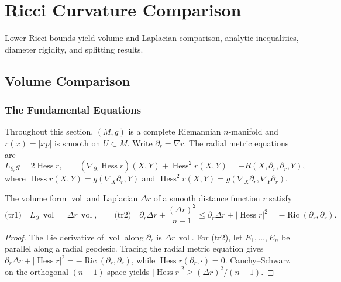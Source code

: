 \chapter{Ricci Curvature Comparison}
\label{chap:pet-ricci-curvature-comparison}

\newcommand{\Ric}{\operatorname{Ric}}
\newcommand{\Hess}{\operatorname{Hess}}
\newcommand{\vol}{\operatorname{vol}}
\newcommand{\diam}{\operatorname{diam}}
\newcommand{\Iso}{\mathrm{Iso}}
\newcommand{\snk}{\mathrm{sn}}

Lower Ricci bounds yield volume and Laplacian comparison, analytic
inequalities, diameter rigidity, and splitting results.

\section{Volume Comparison}

\subsection{The Fundamental Equations}

Throughout this section, $(M,g)$ is a complete Riemannian $n$-manifold and
$r(x)=|xp|$ is smooth on $U\subset M$. Write $\partial_r=\nabla r$. The radial
metric equations are
\[
  L_{\partial_r}g=2\Hess r,
  \qquad
  (\nabla_{\partial_r}\Hess r)(X,Y)+\Hess^2r(X,Y)=-R(X,\partial_r,\partial_r,Y),
\]
where $\Hess r(X,Y)=g(\nabla_X\partial_r,Y)$ and
$\Hess^2r(X,Y)=g(\nabla_X\partial_r,\nabla_Y\partial_r)$.

\begin{proposition}
  \label{prop:pet-ch7-volume-form-laplacian-trace}

  The volume form $\vol$ and Laplacian $\Delta r$ of a smooth distance
  function $r$ satisfy
  \[
    \text{(tr1)}\quad L_{\partial_r}\vol=\Delta r\,\vol,
    \qquad
    \text{(tr2)}\quad \partial_r\Delta r+\frac{(\Delta r)^2}{n-1}
    \le\partial_r\Delta r+|\Hess r|^2=-\Ric(\partial_r,\partial_r).
  \]
\end{proposition}
\begin{proof}
  \sketch
  The Lie derivative of \(\vol\) along \(\partial_r\) is \(\Delta r\,\vol\). For (tr2), let \(E_1,\ldots,E_n\) be parallel along a radial geodesic. Tracing the radial metric equation gives \(\partial_r\Delta r+|\Hess r|^2=-\Ric(\partial_r,\partial_r)\), while \(\Hess r(\partial_r,\cdot)=0\). Cauchy--Schwarz on the orthogonal \((n-1)\)-space yields \(|\Hess r|^2\ge(\Delta r)^2/(n-1)\).
\end{proof}

